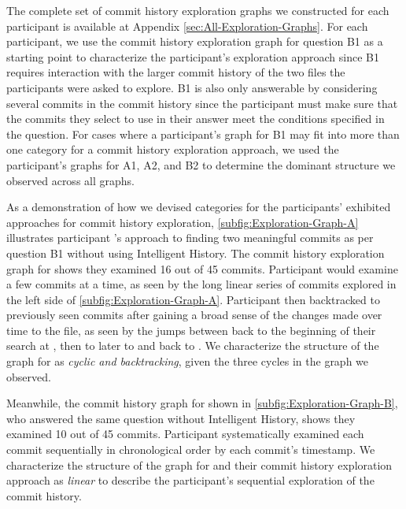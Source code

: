 The complete set of commit history exploration graphs we constructed
for each participant is available at Appendix \ref{sec:All-Exploration-Graphs}.
For each participant, we use the commit history exploration graph for question B1
as a starting point to characterize the participant's exploration approach since
B1 requires interaction with the larger commit history of the two files the participants were asked to explore.
B1 is also only answerable by considering several commits in the commit history since the
participant must make sure that the commits they select to use in their answer meet the conditions specified in the question.
For cases where a participant's graph for B1 may fit into more than one category for a commit history exploration approach,
we used the participant's graphs for A1, A2, and B2 to determine the dominant structure we observed across all graphs.

As a demonstration of how we devised categories for the participants' exhibited approaches for commit history exploration, 
\autoref{subfig:Exploration-Graph-A} illustrates participant 's approach to finding 
two meaningful commits as per question B1 without using Intelligent History.
The commit history exploration graph for  shows they examined 16 out of 45 commits.
Participant  would examine a few commits at a time,
as seen by the long linear series of commits explored in the left side of \autoref{subfig:Exploration-Graph-A}.
Participant  then backtracked to previously seen commits 
after gaining a broad sense of the changes made over time to the file,
as seen by the jumps between  back to the beginning of their search at , 
then to later to  and back to .
We characterize the structure of the graph for  as \textit{cyclic and backtracking},
given the three cycles in the graph we observed.

Meanwhile, the commit history graph for  shown in \autoref{subfig:Exploration-Graph-B}, 
who answered the same question without Intelligent History, shows they examined 10 out of 45 commits.
Participant  systematically examined 
each commit sequentially in chronological order by each commit's timestamp.
We characterize the structure of the graph for  and their commit history exploration approach as \textit{linear} 
to describe the participant's sequential exploration of the commit history.


